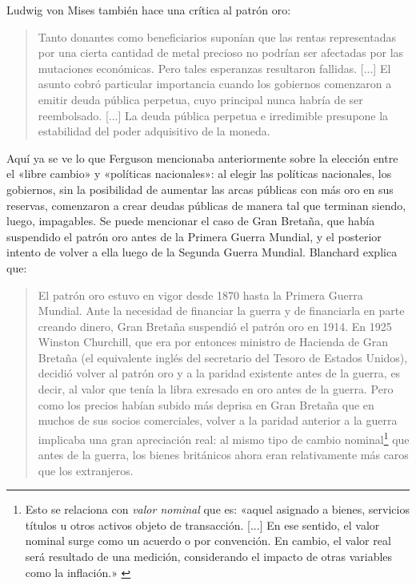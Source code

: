 \documentclass[12pt,a4paper,twoside]{book}
\begin{document}
Ludwig von Mises también hace una crítica al patrón oro:

\begin{quotation}
Tanto donantes como beneficiarios suponían que las rentas representadas por una cierta cantidad de metal precioso no podrían ser afectadas por las mutaciones económicas. Pero tales esperanzas resultaron fallidas. [...] El asunto cobró particular importancia cuando los gobiernos comenzaron a emitir deuda pública perpetua, cuyo principal nunca habría de ser reembolsado. [...] La deuda pública perpetua e irredimible presupone la estabilidad del poder adquisitivo de la moneda. \cite[págs. 272-273]{mises:lah}
\end{quotation}

Aquí ya se ve lo que Ferguson mencionaba anteriormente sobre la elección entre el «libre cambio» y «políticas nacionales»: al elegir las políticas nacionales, los gobiernos, sin la posibilidad de aumentar las arcas públicas con más oro en sus reservas, comenzaron a crear deudas públicas de manera tal que terminan siendo, luego, impagables. Se puede mencionar el caso de Gran Bretaña, que había suspendido el patrón oro antes de la Primera Guerra Mundial, y el posterior intento de volver a ella luego de la Segunda Guerra Mundial. Blanchard explica que:

\begin{quotation}
El patrón oro estuvo en vigor desde 1870 hasta la Primera Guerra Mundial. Ante la necesidad de financiar la guerra y de financiarla en parte creando dinero, Gran Bretaña suspendió el patrón oro en 1914. En 1925 Winston Churchill, que era por entonces ministro de Hacienda de Gran Bretaña (el equivalente inglés del secretario del Tesoro de Estados Unidos), decidió volver al patrón oro y a la paridad existente antes de la guerra, es decir, al valor que tenía la libra exresado en oro antes de la guerra. Pero como los precios habían subido más deprisa en Gran Bretaña que en muchos de sus socios comerciales, volver a la paridad anterior a la guerra implicaba una gran apreciación real: al mismo tipo de cambio nominal\footnote{Esto se relaciona con \textit{valor nominal} que es: «aquel asignado a bienes, servicios títulos u otros activos objeto de transacción. [...] En ese sentido, el valor nominal surge como un acuerdo o por convención. En cambio, el valor real será resultado de una medición, considerando el impacto de otras variables como la inflación.» \cite{epedia:nominal}} que antes de la guerra, los bienes británicos ahora eran relativamente más caros que los extranjeros. \cite[pág. 441]{blanchard}
\end{quotation}
\end{document}
